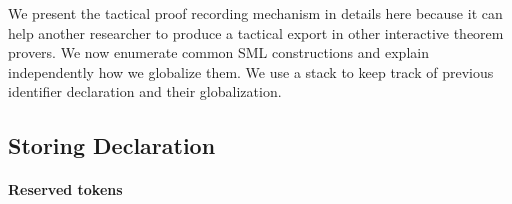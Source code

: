 \documentclass[runningheads,a4paper,draft]{svjour3}
\def\sml{\textsf{SML}\xspace}
\begin{document}
%




%
%



We present the tactical proof recording mechanism in details here because it 
can help 
another researcher to produce a tactical export in other interactive theorem 
provers.
We now enumerate common \sml constructions and explain 
independently how we globalize them. We use a stack to keep track of previous 
identifier declaration and their globalization.






\subsection{Storing Declaration}

\paragraph{Reserved tokens}
\end{document}
